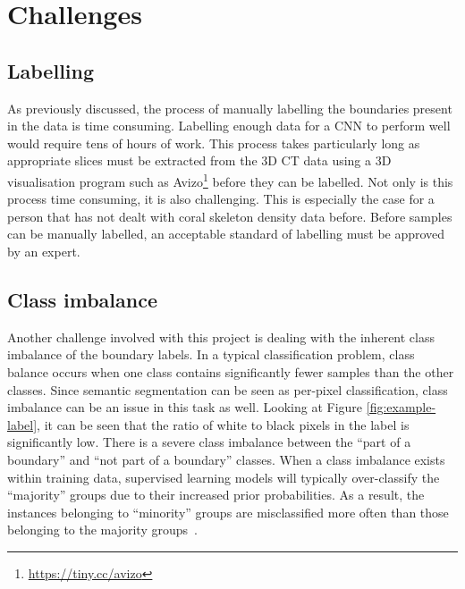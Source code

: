 \section{Challenges}


\subsection{Labelling}

As previously discussed, the process of manually labelling the boundaries present in the data is time consuming. Labelling enough data for a CNN to perform well would require tens of hours of work. This process takes particularly long as appropriate slices must be extracted from the 3D CT data using a 3D visualisation program such as Avizo\footnote{\url{https://tiny.cc/avizo}} before they can be labelled. Not only is this process time consuming, it is also challenging. This is especially the case for a person that has not dealt with coral skeleton density data before. Before samples can be manually labelled, an acceptable standard of labelling must be approved by an expert.

\subsection{Class imbalance}

Another challenge involved with this project is dealing with the inherent class imbalance of the boundary labels. In a typical classification problem, class balance occurs when one class contains significantly fewer samples than the other classes. Since semantic segmentation can be seen as per-pixel classification, class imbalance can be an issue in this task as well. Looking at Figure \ref{fig:example-label}, it can be seen that the ratio of white to black pixels in the label is significantly low. There is a severe class imbalance between the ``part of a boundary'' and ``not part of a boundary'' classes. When a class imbalance exists within training data, supervised learning models will typically over-classify the ``majority'' groups due to their increased prior probabilities. As a result, the instances belonging to ``minority'' groups are misclassified more often than those belonging to the majority groups~\cite{classimbalance}.

